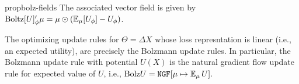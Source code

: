 




\begin{linked}{prop}{bolz-fields}
	The associated vector field is given by
	$
		\mathrm{Boltz}[U]'_\phi \mu = \mu \odot (\operatorname*{\mathbb{E}}_\mu[U_\phi] - U_\phi )
	$.
\end{linked}


\begin{prop}
	The optimizing update rules for $\Theta = \Delta X$ whose loss represntation is linear (i.e., an expected utility), are precisely the Bolzmann update rules.
	In particular, the Bolzmann update rule with potential $U(X)$ is the natural gradient flow update rule for expected value of $U$, i.e.,
	\(
		\mathrm{Bolz} U =
		\mathtt{NGF}[\mu\mapsto\operatorname*{\mathbb{E}}_\mu U] .
	\)
\end{prop}


